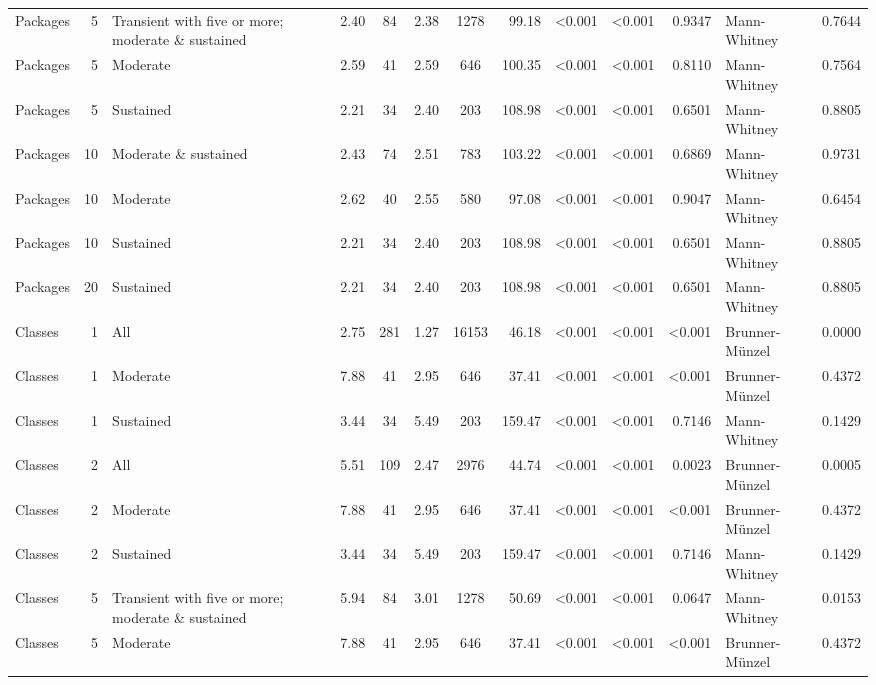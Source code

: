 \begin{table}[H]
{\begin{tabular}{l r p{4cm} c c c c r r r r l r}
Packages & 5 & Transient with five or more; moderate \& sustained &  2.40 & 84 & 2.38 & 1278 & 99.18 & \textless 0.001 & \textless 0.001 & 0.9347 &  Mann-Whitney & 0.7644 \\ 
Packages & 5 & Moderate &  2.59 & 41 & 2.59 & 646 & 100.35 & \textless 0.001 & \textless 0.001 & 0.8110 &  Mann-Whitney & 0.7564 \\ 
Packages & 5 & Sustained &  2.21 & 34 & 2.40 & 203 & 108.98 & \textless 0.001 & \textless 0.001 & 0.6501 &  Mann-Whitney & 0.8805 \\ 
Packages & 10 & Moderate \& sustained &  2.43 & 74 & 2.51 & 783 & 103.22 & \textless 0.001 & \textless 0.001 & 0.6869 &  Mann-Whitney & 0.9731 \\ 
Packages & 10 & Moderate &  2.62 & 40 & 2.55 & 580 & 97.08 & \textless 0.001 & \textless 0.001 & 0.9047 &  Mann-Whitney & 0.6454 \\ 
Packages & 10 & Sustained &  2.21 & 34 & 2.40 & 203 & 108.98 & \textless 0.001 & \textless 0.001 & 0.6501 &  Mann-Whitney & 0.8805 \\ 
Packages & 20 & Sustained &  2.21 & 34 & 2.40 & 203 & 108.98 & \textless 0.001 & \textless 0.001 & 0.6501 &  Mann-Whitney & 0.8805 \\ 
Classes & 1 & All &  2.75 & 281 & 1.27 & 16153 & 46.18 & \textless 0.001 & \textless 0.001 & \textless 0.001 &  Brunner-Münzel & 0.0000 \\ 
Classes & 1 & Moderate &  7.88 & 41 & 2.95 & 646 & 37.41 & \textless 0.001 & \textless 0.001 & \textless 0.001 &  Brunner-Münzel & 0.4372 \\ 
Classes & 1 & Sustained &  3.44 & 34 & 5.49 & 203 & 159.47 & \textless 0.001 & \textless 0.001 & 0.7146 &  Mann-Whitney & 0.1429 \\ 
Classes & 2 & All &  5.51 & 109 & 2.47 & 2976 & 44.74 & \textless 0.001 & \textless 0.001 & 0.0023 &  Brunner-Münzel & 0.0005 \\ 
Classes & 2 & Moderate &  7.88 & 41 & 2.95 & 646 & 37.41 & \textless 0.001 & \textless 0.001 & \textless 0.001 &  Brunner-Münzel & 0.4372 \\ 
Classes & 2 & Sustained &  3.44 & 34 & 5.49 & 203 & 159.47 & \textless 0.001 & \textless 0.001 & 0.7146 &  Mann-Whitney & 0.1429 \\ 
Classes & 5 & Transient with five or more; moderate \& sustained &  5.94 & 84 & 3.01 & 1278 & 50.69 & \textless 0.001 & \textless 0.001 & 0.0647 &  Mann-Whitney & 0.0153 \\ 
Classes & 5 & Moderate &  7.88 & 41 & 2.95 & 646 & 37.41 & \textless 0.001 & \textless 0.001 & \textless 0.001 &  Brunner-Münzel & 0.4372 \\ 

\end{tabular}}
\end{table}
